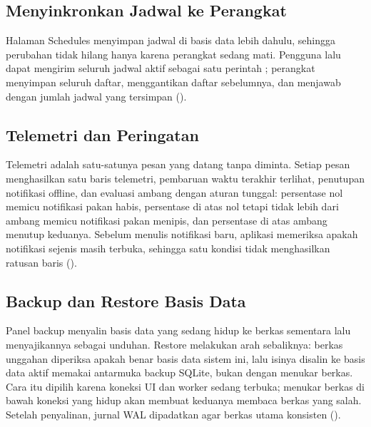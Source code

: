 \subsection{Menyinkronkan Jadwal ke Perangkat}

Halaman Schedules menyimpan jadwal di basis data lebih dahulu, sehingga perubahan
tidak hilang hanya karena perangkat sedang mati. Pengguna lalu dapat mengirim
seluruh jadwal aktif sebagai satu perintah ; perangkat menyimpan
seluruh daftar, menggantikan daftar sebelumnya, dan menjawab dengan jumlah jadwal
yang tersimpan ().


\subsection{Telemetri dan Peringatan}

Telemetri adalah satu-satunya pesan yang datang tanpa diminta. Setiap pesan
menghasilkan satu baris telemetri, pembaruan waktu terakhir terlihat, penutupan
notifikasi offline, dan evaluasi ambang dengan aturan tunggal: persentase nol
memicu notifikasi pakan habis, persentase di atas nol tetapi tidak lebih dari ambang
memicu notifikasi pakan menipis, dan persentase di atas ambang menutup keduanya.
Sebelum menulis notifikasi baru, aplikasi memeriksa apakah notifikasi sejenis masih
terbuka, sehingga satu kondisi tidak menghasilkan ratusan baris
().


\subsection{Backup dan Restore Basis Data}

Panel backup menyalin basis data yang sedang hidup ke berkas sementara lalu
menyajikannya sebagai unduhan. Restore melakukan arah sebaliknya: berkas unggahan
diperiksa apakah benar basis data sistem ini, lalu isinya disalin ke basis data
aktif memakai antarmuka backup SQLite, bukan dengan menukar berkas. Cara itu dipilih
karena koneksi UI dan worker sedang terbuka; menukar berkas di bawah koneksi yang
hidup akan membuat keduanya membaca berkas yang salah. Setelah penyalinan, jurnal
WAL dipadatkan agar berkas utama konsisten ().

